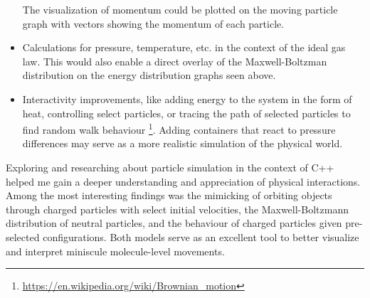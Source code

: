 \documentclass{article}
\begin{document}
\begin{itemize}
    The visualization of momentum could be plotted on the moving particle graph with vectors showing the momentum of each particle.
    \item Calculations for pressure, temperature, etc. in the context of the ideal gas law.
    This would also enable a direct overlay of the Maxwell-Boltzman distribution on the energy distribution graphs seen above.
    \item Interactivity improvements, like adding energy to the system in the form of heat, controlling select particles,
    or tracing the path of selected particles to find random walk behaviour
    \footnote{\url{https://en.wikipedia.org/wiki/Brownian_motion}}.
    Adding containers that react to pressure differences may serve as a more realistic simulation of the physical world.
\end{itemize}

Exploring and researching about particle simulation in the context of C++
helped me gain a deeper understanding and appreciation of physical interactions.
Among the most interesting findings was the mimicking of orbiting
objects through charged particles with select initial velocities,
the Maxwell-Boltzmann distribution of neutral particles,
and the behaviour of charged particles given pre-selected configurations.
Both models serve as an excellent tool to better visualize and interpret miniscule molecule-level movements.
\end{document}
